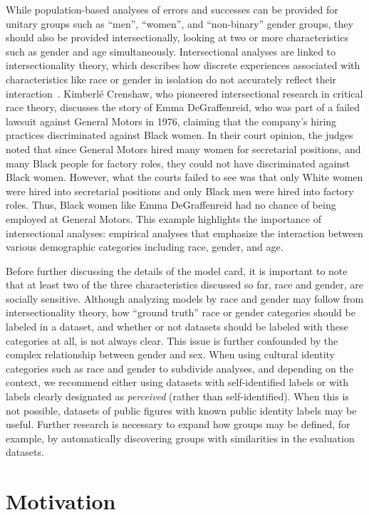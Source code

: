 \documentclass[format=sigconf]{acmart}
\begin{document}
While population-based analyses of errors and successes can be provided for unitary groups such as ``men'', ``women'', and ``non-binary'' gender groups, they should also be provided intersectionally, looking at two or more characteristics such as gender and age simultaneously. Intersectional analyses are linked to intersectionality theory, which describes how discrete experiences associated with characteristics like race or gender in isolation do not accurately reflect their interaction~\cite{intersection}. Kimberl\'e Crenshaw, who pioneered intersectional research in critical race theory, discusses the story of Emma DeGraffenreid, who was part of a failed lawsuit against General Motors in 1976, claiming that the company's hiring practices discriminated against Black women. In their court opinion, the judges noted that since General Motors hired many women for secretarial positions, and many Black people for factory roles, they could not have discriminated against Black women. However, what the courts failed to see was that only White women were hired into secretarial positions and only Black men were hired into factory roles. Thus, Black women like Emma DeGraffenreid had no chance of being employed at General Motors. This example highlights the importance of intersectional analyses: empirical analyses that emphasize the interaction between various demographic categories including race, gender, and age.

Before further discussing the details of the model card, it is important to note that at least two of the three characteristics discussed so far, race and gender, are socially sensitive.  Although analyzing models by race and gender may follow from intersectionality theory, how ``ground truth'' race or gender categories should be labeled in a dataset, and whether or not datasets should be labeled with these categories at all, is not always clear. This issue is further confounded by the complex relationship between gender and sex.  When using cultural identity categories such as race and gender to subdivide analyses, and depending on the context, we recommend either using datasets with self-identified labels or with labels clearly designated as {\it perceived} (rather than self-identified).  When this is not possible, datasets of public figures with known public identity labels may be useful.  Further research is necessary to expand how groups may be defined, for example, by automatically discovering groups with similarities in the evaluation datasets.

\section{Motivation}\label{sec:motivation}
\end{document}
